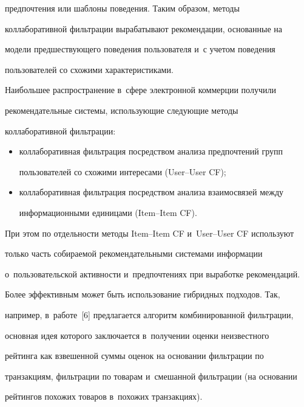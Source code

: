 предпочтения или шаблоны поведения. Таким образом, методы 


коллаборативной фильтрации вырабатывают рекомендации, основанные на 


модели предшествующего поведения пользователя и~с учетом поведения 


пользователей со схожими характеристиками. 


  


  Наибольшее распространение в~сфере электронной коммерции получили 


рекомендательные системы, использующие следующие методы 


коллаборативной фильтрации: 


  \begin{itemize}


\item коллаборативная фильтрация посредством анализа предпочтений групп 


пользователей со схожими интересами (User--User CF);


\item коллаборативная фильтрация посредством анализа взаимосвязей между 


информационными единицами (Item--Item CF).


  \end{itemize}


   При этом по отдельности методы Item--Item CF и~User--User CF используют 


только часть собираемой рекомендательными системами информации 


о~пользовательской активности и~предпочтениях при выработке рекомендаций. 


Более эффективным может быть использование гибридных подходов. Так, 


например, в~работе~[6] предлагается алгоритм комбинированной фильтрации, 


основная идея которого заключается в~получении оценки неизвестного 


рейтинга как взвешенной суммы оценок на основании фильтрации по 


транзакциям, фильтрации по товарам и~смешанной фильтрации (на основании 


рейтингов похожих товаров в~похожих транзакциях).





\vspace*{-6pt}


